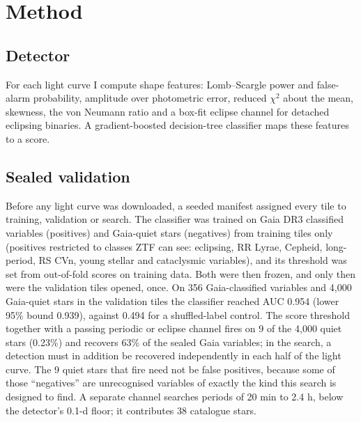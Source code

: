 \documentclass[twocolumn]{searchchev_preprint}
\begin{document}
\section{Method}
\subsection{Detector}
For each light curve I compute shape features: Lomb--Scargle \citep{Lomb1976,Scargle1982} power and false-alarm
probability, amplitude over photometric error, reduced $\chi^2$ about the mean, skewness, the von Neumann ratio and a
box-fit eclipse channel for detached eclipsing binaries. A gradient-boosted decision-tree classifier maps these features
to a score.

\subsection{Sealed validation}
Before any light curve was downloaded, a seeded manifest assigned every tile to training, validation or search. The
classifier was trained on Gaia DR3 classified variables (positives) and Gaia-quiet stars (negatives) from training
tiles only (positives restricted to classes ZTF can see: eclipsing, RR Lyrae, Cepheid, long-period, RS CVn, young
stellar and cataclysmic variables), and its threshold was set from out-of-fold scores on training data. Both were then frozen, and only then
were the validation tiles opened, once. On 356 Gaia-classified variables and 4,000 Gaia-quiet stars in the validation
tiles the classifier reached AUC 0.954 (lower 95\% bound 0.939), against 0.494 for a shuffled-label control. The score
threshold together with a passing periodic or eclipse channel fires on 9 of the 4,000 quiet stars (0.23\%) and
recovers 63\% of the sealed Gaia variables; in the search, a detection must in addition be recovered independently in
each half of the light curve. The 9 quiet stars that fire need not be false positives, because some of those
``negatives'' are unrecognised variables of exactly the kind this search is designed to find. A separate channel
searches periods of 20 min to 2.4 h, below the detector's 0.1-d floor; it contributes 38 catalogue stars.
\end{document}
